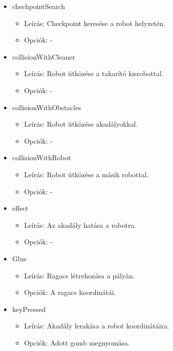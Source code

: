\begin{itemize}
\item chechpointSearch
	\begin{itemize}
	\item Leírás: Checkpoint keresése a robot helyzetén.
	\item Opciók: -
	\end{itemize}
	
\item collisionWithCleaner
	\begin{itemize}
	\item Leírás: Robot ütközése a takarító kisrobottal.
	\item Opciók: -
	\end{itemize}
	
\item collisionWithObstacles
	\begin{itemize}
	\item Leírás: Robot ütközése akadályokkal.
	\item Opciók: -
	\end{itemize}
	
\item collisionWithRobot
	\begin{itemize}
	\item Leírás: Robot ütközése a másik robottal.
	\item Opciók: -
	\end{itemize}
	
\item effect
	\begin{itemize}
	\item Leírás: Az akadály hatása a robotra.
	\item Opciók: -
	\end{itemize}
	
\item Glue
	\begin{itemize}
	\item Leírás: Ragacs létrehozása a pályán.
	\item Opciók: A ragacs koordinátái.
	\end{itemize}
	
\item keyPressed
	\begin{itemize}
	\item Leírás: Akadály lerakása a robot koordinátáira.
	\item Opciók: Adott gomb megnyomása.
	\end{itemize}
	

\end{itemize}

